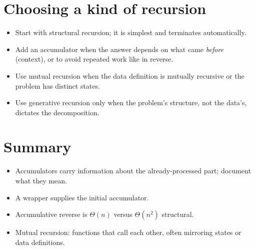 \section{Choosing a kind of recursion}
\begin{itemize}
  \item Start with structural recursion; it is simplest and terminates automatically.
  \item Add an accumulator when the answer depends on what came \emph{before} (context), or to avoid repeated work like  in reverse.
  \item Use mutual recursion when the data definition is mutually recursive or the problem has distinct states.
  \item Use generative recursion only when the problem's structure, not the data's, dictates the decomposition.
\end{itemize}

\section{Summary}
\begin{itemize}
  \item Accumulators carry information about the already-processed part; document what they mean.
  \item A wrapper supplies the initial accumulator.
  \item Accumulative reverse is $\Theta(n)$ versus $\Theta(n^2)$ structural.
  \item Mutual recursion: functions that call each other, often mirroring states or data definitions.
\end{itemize}
